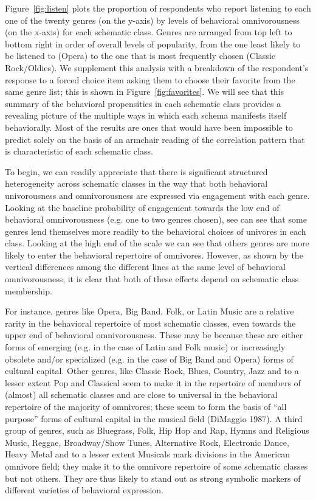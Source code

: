 \documentclass[preprint,12pt]{elsarticle}
\begin{document}
Figure~\ref{fig:listen} plots the proportion of respondents who report listening to each one of the twenty genres (on the y-axis) by levels of behavioral omnivorousness (on the x-axis) for each schematic class. Genres are arranged from top left to bottom right in order of overall levels of popularity, from the one least likely to be listened to (Opera) to the one that is most frequently chosen (Classic Rock/Oldies). We supplement this analysis with a breakdown of the respondent's response to a forced choice item asking them to choose their favorite from the same genre list; this is shown in Figure~\ref{fig:favorites}. We will see that this summary of the behavioral propensities in each schematic class provides a revealing picture of the multiple ways in which each schema manifests itself behaviorally. Most of the results are ones that would have been impossible to predict  solely on the basis of an armchair reading of the correlation pattern that is characteristic of each schematic class.

To begin, we can readily appreciate that there is significant structured heterogeneity  across schematic classes in the way that both behavioral univorousness and omnivorousness are expressed via  engagement with each genre. Looking at the baseline probability of engagement towards the low end of behavioral omnivorousness (e.g. one to two genres chosen), see can see that some genres lend themselves more readily to the behavioral choices of univores in each class. Looking at the high end of the scale we can see that others genres are more likely to enter the behavioral repertoire of omnivores. However, as shown by the vertical differences among the different lines at the same level of behavioral omnivorousness, it is clear that both of these effects depend on schematic class membership. 

For instance, genres like Opera, Big Band, Folk, or Latin Music are a relative rarity in the behavioral repertoire of most schematic classes, even towards the upper end of behavioral omnivorousness. These may be because these are either forms of emerging (e.g. in the case of Latin and Folk music) or increasingly obsolete and/or specialized (e.g. in the case of Big Band and Opera) forms of cultural capital. Other genres, like Classic Rock, Blues, Country, Jazz and to a lesser extent Pop and Classical seem to make it in the  repertoire of members of (almost) all schematic classes and are close to universal in the behavioral repertoire of the majority of omnivores; these seem to form the basis of ``all purpose'' forms of cultural capital in the musical field (DiMaggio 1987). A third group of genres, such as Bluegrass, Folk, Hip Hop and Rap, Hymns and Religious Music, Reggae, Broadway/Show Tunes, Alternative Rock, Electronic Dance, Heavy Metal and to a lesser extent Musicals mark divisions in the American omnivore field; they make it to the omnivore repertoire of some schematic classes but not others. They are thus likely to stand out as strong symbolic markers of different varieties of behavioral expression.
\end{document}
